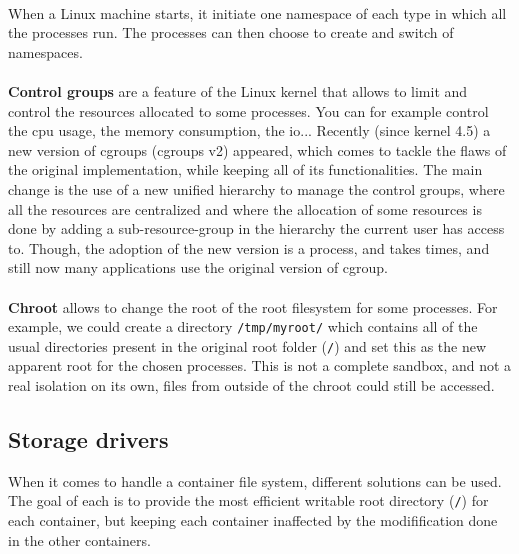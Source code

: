 \paragraph{}When a Linux machine starts, it initiate one namespace of each type in which all the processes run.  The processes can then choose to create and switch of namespaces.

\paragraph{}\textbf{Control groups} are a feature of the Linux kernel that allows to limit and control the resources allocated to some processes.  You can for example control the cpu usage, the memory consumption, the io...  Recently (since kernel 4.5) a new version of cgroups (cgroups v2) appeared, which comes to tackle the flaws of the original implementation, while keeping all of its functionalities.  The main change is the use of a new unified hierarchy to manage the control groups, where all the resources are centralized and where the allocation of some resources is done by adding a sub-resource-group in the hierarchy the current user has access to.
Though, the adoption of the new version is a process, and takes times, and still now many applications use the original version of cgroup.

\paragraph{}\textbf{Chroot} allows to change the root of the root filesystem for some processes.  For example, we could create a directory \texttt{/tmp/myroot/} which contains all of the usual directories present in the original root folder (\texttt{/}) and set this as the new apparent root for the chosen processes.  This is not a complete sandbox, and not a real isolation on its own, files from outside of the chroot could still be accessed.

\subsection{Storage drivers}
When it comes to handle a container file system, different solutions can be used.  The goal of each is to provide the most efficient writable root directory (\texttt{/}) for each container, but keeping each container inaffected by the modifification done in the other containers.

